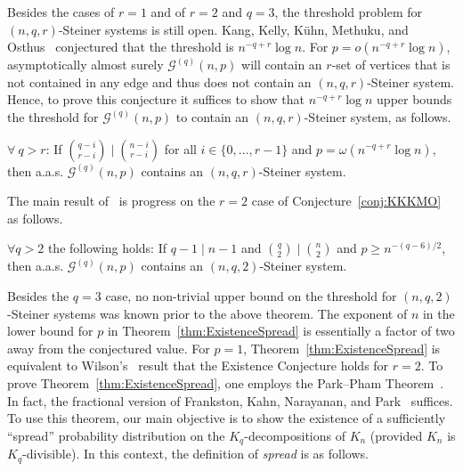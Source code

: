 \documentclass[twoside,leqno]{article}
\begin{document}
Besides the cases of $r = 1$ and of $r = 2$ and $q = 3$, the threshold problem for $(n, q, r)$-Steiner systems is still open.  
Kang, Kelly, K\"uhn, Methuku, and Osthus~\cite{KKKMO22} conjectured that the threshold is $n^{-q+r}\log n$.  
For $p = o(n^{-q+r}\log n)$, asymptotically almost surely $\mathcal{G}^{(q)}(n,p)$ will contain an $r$-set of vertices that is not contained in any edge and thus does not contain an $(n,q,r)$-Steiner system.  Hence, to prove this conjecture it suffices to show that $n^{-q+r}\log n$ upper bounds the threshold for $\mathcal{G}^{(q)}(n,p)$ to contain an $(n,q,r)$-Steiner system, as follows.

\begin{conj}\label{conj:KKKMO} $\forall~q > r$: If $\binom{q - i}{r - i} \mid \binom{n - i}{r - i}$ for all $i \in \{0, \dots, r-1\}$ and $p = \omega(n^{-q+r}\log n)$, then
a.a.s. $\mathcal{G}^{(q)}(n, p)$ contains an $(n,q,r)$-Steiner system.
\end{conj}

The main result of~\cite{DKPIV} is progress on the $r=2$ case of Conjecture~\ref{conj:KKKMO} as follows.

\begin{thm}\label{thm:ExistenceSpread} $\forall q > 2$ the following holds:  
If $q - 1 \mid n - 1$ and $\binom{q}{2}\mid \binom{n}{2}$ and $p\geq n^{-(q-6)/2}$, then a.a.s. $\mathcal{G}^{(q)}(n,p)$ contains an $(n, q, 2)$-Steiner system.
\end{thm}

Besides the $q = 3$ case, no non-trivial upper bound on the threshold for $(n,q,2)$-Steiner systems was known prior to the above theorem.  
The exponent of $n$ in the lower bound for $p$ in Theorem~\ref{thm:ExistenceSpread} is essentially a factor of two away from the conjectured value.
For $p = 1$, Theorem~\ref{thm:ExistenceSpread} is equivalent to Wilson's~\cite{WI, WII, WIII} result that the Existence Conjecture holds for $r = 2$. To prove Theorem~\ref{thm:ExistenceSpread}, one employs the Park--Pham Theorem~\cite{PP23}.  In fact, the fractional version of Frankston, Kahn, Narayanan, and Park~\cite{FKNP21} suffices.  To use this theorem, our main objective is to show the existence of a sufficiently ``spread'' probability distribution on the $K_q$-decompositions of $K_n$ (provided $K_n$ is $K_q$-divisible). In this context, the definition of \textit{spread} is as follows. %
\end{document}
